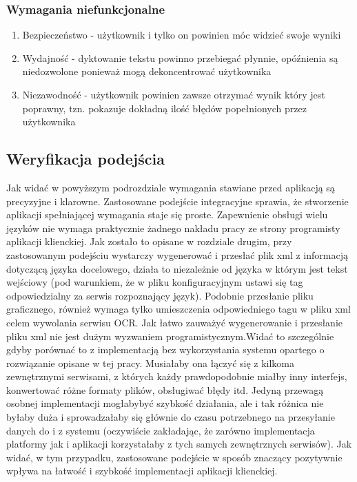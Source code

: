 \subsubsection{Wymagania niefunkcjonalne}
\begin{enumerate}
	\item Bezpieczeństwo - użytkownik i tylko on powinien móc widzieć swoje wyniki
	\item Wydajność - dyktowanie tekstu powinno przebiegać płynnie, opóźnienia są niedozwolone ponieważ mogą dekoncentrować użytkownika
	\item Niezawodność - użytkownik powinien zawsze otrzymać wynik który jest poprawny, tzn. pokazuje dokładną ilość błędów popełnionych przez użytkownika
\end{enumerate}

\subsection{Weryfikacja podejścia}
Jak widać w powyższym podrozdziale wymagania stawiane przed aplikacją są precyzyjne i klarowne. Zastosowane podejście integracyjne sprawia, że stworzenie aplikacji spełniającej wymagania staje się proste. Zapewnienie obsługi wielu języków nie wymaga praktycznie żadnego nakładu pracy ze strony programisty aplikacji klienckiej. Jak zostało to opisane w rozdziale drugim, przy zastosowanym podejściu wystarczy wygenerować i przesłać plik xml z informacją dotyczącą języka docelowego, działa to niezależnie od języka w którym jest tekst wejściowy (pod warunkiem, że w pliku konfiguracyjnym ustawi się tag odpowiedzialny za serwis rozpoznający język). Podobnie przesłanie pliku graficznego, również wymaga tylko umieszczenia odpowiedniego tagu w pliku xml celem wywolania serwisu OCR. Jak łatwo zauważyć wygenerowanie i przesłanie pliku xml nie jest dużym wyzwaniem programistycznym.Widać to szczególnie gdyby porównać to z implementacją bez wykorzystania systemu opartego o rozwiązanie opisane w tej pracy. Musiałaby ona łączyć się z kilkoma zewnętrznymi serwisami, z których każdy prawdopodobnie miałby inny interfejs, konwertować różne formaty plików, obsługiwać błędy itd. Jedyną przewagą osobnej implementacji mogłabybyć szybkość działania, ale i tak różnica nie byłaby duża i sprowadzałaby się głównie do czasu potrzebnego na przesyłanie danych do i z systemu (oczywiście zakładając, że zarówno implementacja platformy jak i aplikacji korzystałaby z tych samych zewnętrznych serwisów). 
Jak widać, w tym przypadku, zastosowane podejście w sposób znaczący pozytywnie wpływa na łatwość i szybkość implementacji aplikacji klienckiej. \\

